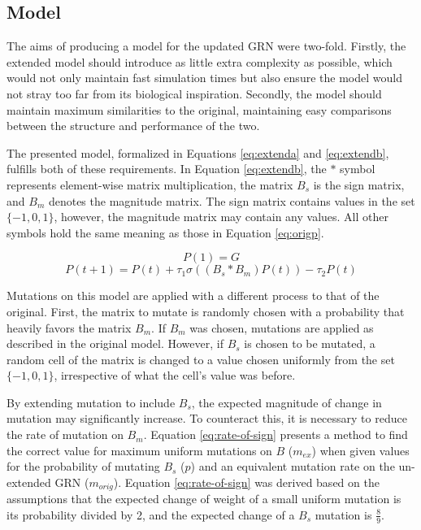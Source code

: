 \documentclass[twocolumn,a4paper,11pt]{article}
\begin{document}
    \subsection{Model}
    The aims of producing a model for the updated GRN were two-fold. Firstly, the extended model should introduce as little extra complexity as possible, which would not only maintain fast simulation times but also ensure the model would not stray too far from its biological inspiration. Secondly, the model should maintain maximum similarities to the original, maintaining easy comparisons between the structure and performance of the two.

    The presented model, formalized in Equations \ref{eq:extenda} and \ref{eq:extendb}, fulfills both of these requirements. In Equation \ref{eq:extendb}, the $*$ symbol represents element-wise matrix multiplication, the matrix $B_s$ is the sign matrix, and $B_m$ denotes the magnitude matrix. The sign matrix contains values in the set $\{-1,0,1\}$, however, the magnitude matrix may contain any values. All other symbols hold the same meaning as those in Equation \ref{eq:origp}.

    \begin{equation} \label{eq:extenda}
        P(1) = G
    \end{equation}
    \begin{equation} \label{eq:extendb}
        P(t+1) = P(t) + \tau_1 \sigma ((B_s * B_m) P(t)) - \tau_2 P(t)
    \end{equation}

    Mutations on this model are applied with a different process to that of the original. First, the matrix to mutate is randomly chosen with a probability that heavily favors the matrix $B_m$. If $B_m$ was chosen, mutations are applied as described in the original model. However, if $B_s$ is chosen to be mutated, a random cell of the matrix is changed to a value chosen uniformly from the set $\{-1,0,1\}$, irrespective of what the cell's value was before.

    By extending mutation to include $B_s$, the expected magnitude of change in mutation may significantly increase. To counteract this, it is necessary to reduce the rate of mutation on $B_m$. Equation \ref{eq:rate-of-sign} presents a method to find the correct value for maximum uniform mutations on $B$ ($m_{ex}$) when given values for the probability of mutating $B_s$ ($p$) and an equivalent mutation rate on the un-extended GRN ($m_{orig}$). Equation \ref{eq:rate-of-sign} was derived based on the assumptions that the expected change of weight of a small uniform mutation is its probability divided by 2, and the expected change of a $B_s$ mutation is $\frac{8}{9}$.
\end{document}

